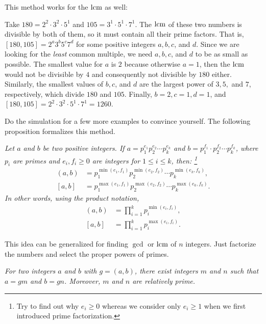 \documentclass{subfile}
\begin{document}
	This method works for the $\operatorname{lcm}$ as well:
	\begin{example}
		Take $180=2^2\cdot3^2\cdot5^1$ and $105=3^1\cdot5^1\cdot7^1$. The $\operatorname{lcm}$ of these two numbers is divisible by both of them, so it must contain all their prime factors. That is, $[180, 105]=2^a3^b5^c7^d$ for some positive integers $a,b,c$, and $d$. Since we are looking for the \textit{least} common multiple, we need $a,b,c$, and $d$ to be as small as possible. The smallest value for $a$ is $2$ because otherwise $a=1$, then the $\operatorname{lcm}$ would not be divisible by $4$ and consequently not divisible by $180$ either. Similarly, the smallest values of $b,c$, and $d$ are the largest power of $3, 5,$ and $7$, respectively, which divide $180$ and $105$. Finally, $b=2, c=1, d=1$, and $[180, 105] = 2^2\cdot3^2\cdot5^1 \cdot 7^1 = 1260$.
	\end{example}
	Do the simulation for a few more examples to convince yourself. The following proposition formalizes this method.

	\begin{proposition}\slshape\label{prop:gcdfactorization}
		Let $a$ and $b$ be two positive integers. If $a=p_1^{e_1}p_2^{e_2}\cdots p_k^{e_k}$ and $b=p_1^{f_1}\cdot p_2^{f_2}\cdots p_k^{f_k}$, where $p_i$ are primes and $e_i,f_i\geq0$ are integers for $1\leq i\leq k$, then: \footnote{Try to find out why $e_i\geq0$ whereas we consider only $e_i\geq1$ when we first introduced prime factorization.}
		\begin{align*}
			(a,b) & =p_1^{\min(e_1,f_1)}p_2^{\min(e_2,f_2)}\cdots p_k^{\min(e_k,f_k)}, \\
			[a,b] &= p_1^{\max(e_1,f_1)}p_2^{ \max (e_2,f_2)}\cdots p_k^{\max(e_k,f_k)}.
		\end{align*}
		In other words, using  the product notation,
		\begin{align*}
			(a,b) & =\prod_{i=1}^kp_i^{\min(e_i,f_i)},\\
			[a,b] & =\prod_{i=1}^kp_i^{\max(e_i,f_i)}.
		\end{align*}
	\end{proposition}

	\begin{note}
		This idea can be generalized for finding $\gcd$ or $\operatorname{lcm}$ of $n$ integers. Just factorize the numbers and select the proper powers of primes.
	\end{note}
	\begin{proposition}\slshape\label{prop:gcduncommon}
		For two integers $a$ and $b$ with $g=(a,b)$, there exist integers $m$ and $n$ such that $a=gm$ and $b=gn$. Moreover, $m$ and $n$ are relatively prime.
	\end{proposition}
\end{document}
